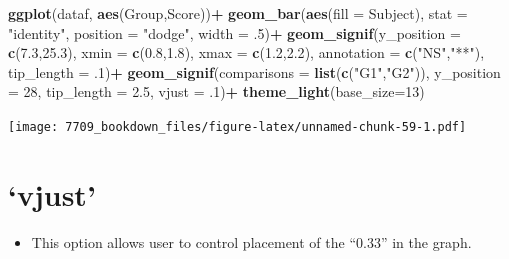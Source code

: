 \documentclass[]{book}
\newenvironment{Shaded}{\begin{snugshade}}{\end{snugshade}}
\newcommand{\DataTypeTok}[1]{\textcolor[rgb]{0.13,0.29,0.53}{#1}}
\newcommand{\DecValTok}[1]{\textcolor[rgb]{0.00,0.00,0.81}{#1}}
\newcommand{\FloatTok}[1]{\textcolor[rgb]{0.00,0.00,0.81}{#1}}
\newcommand{\KeywordTok}[1]{\textcolor[rgb]{0.13,0.29,0.53}{\textbf{#1}}}
\newcommand{\NormalTok}[1]{#1}
\newcommand{\OperatorTok}[1]{\textcolor[rgb]{0.81,0.36,0.00}{\textbf{#1}}}
\newcommand{\StringTok}[1]{\textcolor[rgb]{0.31,0.60,0.02}{#1}}
\providecommand{\tightlist}{%
  \setlength{\itemsep}{0pt}\setlength{\parskip}{0pt}}
\begin{document}
\begin{Shaded}
\begin{Highlighting}[]
\KeywordTok{ggplot}\NormalTok{(dataf, }\KeywordTok{aes}\NormalTok{(Group,Score))}\OperatorTok{+}
\StringTok{  }\KeywordTok{geom_bar}\NormalTok{(}\KeywordTok{aes}\NormalTok{(}\DataTypeTok{fill =}\NormalTok{ Subject), }\DataTypeTok{stat =} \StringTok{"identity"}\NormalTok{, }
           \DataTypeTok{position =} \StringTok{"dodge"}\NormalTok{, }\DataTypeTok{width =} \FloatTok{.5}\NormalTok{)}\OperatorTok{+}
\StringTok{  }\KeywordTok{geom_signif}\NormalTok{(}\DataTypeTok{y_position =} \KeywordTok{c}\NormalTok{(}\FloatTok{7.3}\NormalTok{,}\FloatTok{25.3}\NormalTok{), }\DataTypeTok{xmin =} \KeywordTok{c}\NormalTok{(}\FloatTok{0.8}\NormalTok{,}\FloatTok{1.8}\NormalTok{), }
              \DataTypeTok{xmax =} \KeywordTok{c}\NormalTok{(}\FloatTok{1.2}\NormalTok{,}\FloatTok{2.2}\NormalTok{), }\DataTypeTok{annotation =} \KeywordTok{c}\NormalTok{(}\StringTok{"NS"}\NormalTok{,}\StringTok{"**"}\NormalTok{),}
              \DataTypeTok{tip_length =} \FloatTok{.1}\NormalTok{)}\OperatorTok{+}
\StringTok{  }\KeywordTok{geom_signif}\NormalTok{(}\DataTypeTok{comparisons =} \KeywordTok{list}\NormalTok{(}\KeywordTok{c}\NormalTok{(}\StringTok{"G1"}\NormalTok{,}\StringTok{"G2"}\NormalTok{)), }\DataTypeTok{y_position =} \DecValTok{28}\NormalTok{,}
              \DataTypeTok{tip_length =} \FloatTok{2.5}\NormalTok{, }\DataTypeTok{vjust =} \FloatTok{.1}\NormalTok{)}\OperatorTok{+}
\StringTok{  }\KeywordTok{theme_light}\NormalTok{(}\DataTypeTok{base_size=}\DecValTok{13}\NormalTok{)}
\end{Highlighting}
\end{Shaded}

\texttt{[image: 7709\_bookdown\_files/figure-latex/unnamed-chunk-59-1.pdf]}

\hypertarget{vjust}{%
\section{`vjust'}\label{vjust}}

\begin{itemize}
\tightlist
\item
  This option allows user to control placement of the ``0.33'' in the graph.
\end{itemize}
\end{document}
